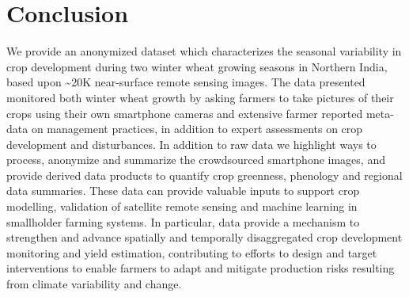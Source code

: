\documentclass[, manuscript]{copernicus}
\begin{document}
\section{Conclusion}

We provide an anonymized dataset which characterizes the seasonal
variability in crop development during two winter wheat growing seasons
in Northern India, based upon \textasciitilde{}20K near-surface remote
sensing images. The data presented monitored both winter wheat growth by
asking farmers to take pictures of their crops using their own
smartphone cameras and extensive farmer reported meta-data on management
practices, in addition to expert assessments on crop development and
disturbances. In addition to raw data we highlight ways to process,
anonymize and summarize the crowdsourced smartphone images, and provide
derived data products to quantify crop greenness, phenology and regional
data summaries. These data can provide valuable inputs to support crop
modelling, validation of satellite remote sensing and machine learning
in smallholder farming systems. In particular, data provide a mechanism
to strengthen and advance spatially and temporally disaggregated crop
development monitoring and yield estimation, contributing to efforts to
design and target interventions to enable farmers to adapt and mitigate
production risks resulting from climate variability and change.








\end{document}
